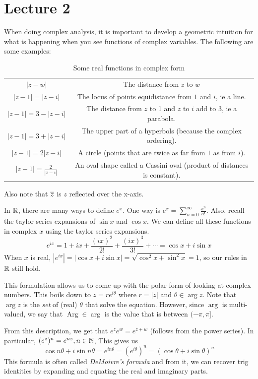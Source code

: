 \documentclass[11pt,leqno,oneside]{amsart}
\newcommand{\Arg}{\operatorname{Arg}}
\begin{document}
\section{Lecture 2}
When doing complex analysis, it is important to develop a geometric intuition
for what is happening when you see functions of complex variables. The
following are some examples:
\begin{table}
    \centering
    \begin{tabular}{|c|c|}
        \hline
        $|z-w|$ & The distance from $z$ to $w$ \\
        $|z-1|=|z-i|$ & The locus of points equidistance from $1$ and $i$, ie a line. \\
        $|z-1|=3-|z-i|$ & The distance from $z$ to 1 and $z$ to $i$ add to 3, ie a parabola. \\
        $|z-1|=3+|z-i|$ & The upper part of a hyperbols (because the complex ordering). \\
        $|z-1|=2|z-i|$ & A circle (points that are twice as far from $1$ as from $i$). \\
        $|z-1|=\frac{2}{|z-i|}$ & An oval shape called a Cassini oval (product of distances is constant). \\
        \hline
    \end{tabular}
    \caption{Some real functions in complex form}
    \label{tab:func-descs}
\end{table}
Also note that $\overline{z}$ is $z$ reflected over the x-axis.

In ${\mathbb R}$, there are many ways to define $e^x$. One way is $e^x =
\sum_{n=0}^\infty \frac{x^n}{n!}$. Also, recall the taylor series expansions of
$\sin x$ and $\cos x$. We can define all these functions in complex $x$ using
the taylor series expansions.
\[
    e^{ix} = 1 + ix + \frac{(ix)^2}{2!} + \frac{(ix)^3}{3!} + \cdots = \cos x + i \sin x
\]
When $x$ is real, $|e^{ix}| = |\cos x + i \sin x| = \sqrt{\cos^2 x + \sin^2 x}
= 1$, so our rules in ${\mathbb R}$ still hold.

This formulation allows us to come up with the polar form of looking at complex
numbers. This boils down to $z = r e^{i \theta}$ where $r = |z|$ and $\theta
\in \arg z$. Note that $\arg z$ is the \emph{set} of (real) $\theta$ that solve
the equation. However, since $\arg$ is multi-valued, we say that $\Arg \in
\arg$ is the value that is between $(-\pi, \pi]$.

From this description, we get that $e^z e^w = e^{z+w}$ (follows from the power series). In particular, $(e^z)^n = e^{nz}, n \in {\mathbb N}$, This gives us \[
    \cos n \theta + i \sin n \theta = e^{in\theta} = (e^{i\theta})^n = (\cos \theta + i \sin \theta)^n
\]
This formula is often called \emph{DeMoivre's formula} and from it, we can
recover trig identities by expanding and equating the real and imaginary parts.
\end{document}
